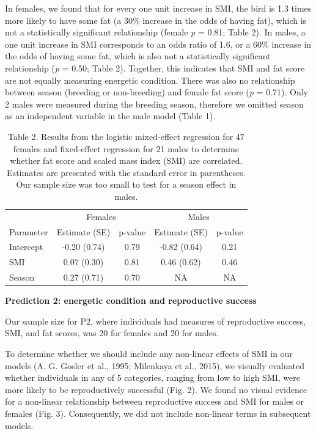 \documentclass[
]{article}
\begin{document}
In females, we found that for every one unit increase in SMI, the bird
is 1.3 times more likely to have some fat (a 30\% increase in the odds
of having fat), which is not a statistically significant relationship
(female \emph{p} = 0.81; Table 2). In males, a one unit increase in SMI
corresponds to an odds ratio of 1.6, or a 60\% increase in the odds of
having some fat, which is also not a statistically significant
relationship (\emph{p} = 0.50; Table 2). Together, this indicates that
SMI and fat score are not equally measuring energetic condition. There
was also no relationship between season (breeding or non-breeding) and
female fat score (\emph{p} = 0.71). Only 2 males were measured during
the breeding season, therefore we omitted season as an independent
variable in the male model (Table 1).

\begin{table}

\caption{\label{tab:p1 results}Table 2. Results from the logistic mixed-effect regression for 47 females and fixed-effect regression for 21 males to determine whether fat score and scaled mass index (SMI) are correlated. Estimates are presented with the standard error in parentheses. Our sample size was too small to test for a season effect in males.}
\centering
\begin{tabular}[t]{lcccc}
\toprule
\multicolumn{1}{c}{ } & \multicolumn{2}{c}{Females} & \multicolumn{2}{c}{Males} \\
\cmidrule(l{3pt}r{3pt}){2-3} \cmidrule(l{3pt}r{3pt}){4-5}
Parameter & Estimate (SE) & p-value & Estimate (SE) & p-value\\
\midrule
Intercept & -0.20 (0.74) & 0.79 & -0.82 (0.64) & 0.21\\
SMI & 0.07 (0.30) & 0.81 & 0.46 (0.62) & 0.46\\
Season & 0.27 (0.71) & 0.70 & NA & NA\\
\bottomrule
\end{tabular}
\end{table}

\textbf{Prediction 2: energetic condition and reproductive success}

Our sample size for P2, where individuals had measures of reproductive
success, SMI, and fat scores, was 20 for females and 20 for males.

To determine whether we should include any non-linear effects of SMI in
our models (A. G. Gosler et al., 1995; Milenkaya et al., 2015), we
visually evaluated whether individuals in any of 5 categories, ranging
from low to high SMI, were more likely to be reproductively successful
(Fig. 2). We found no visual evidence for a non-linear relationship
between reproductive success and SMI for males or females (Fig. 3).
Consequently, we did not include non-linear terms in subsequent models.
\end{document}

